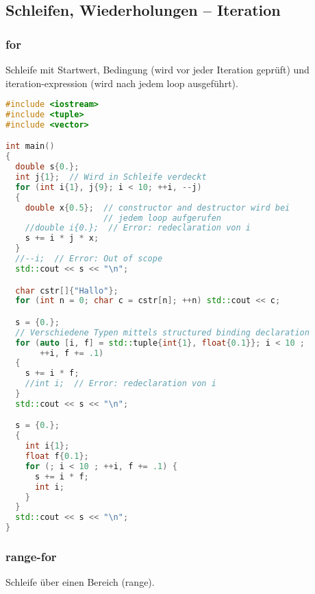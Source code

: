 \documentclass[10pt,twocolumn]{scrartcl}
\begin{document}
\subsection{Schleifen, Wiederholungen -- Iteration}
\subsubsection{for}

Schleife mit Startwert, Bedingung (wird vor jeder Iteration geprüft) und
iteration-expression (wird nach jedem loop ausgeführt).

\begin{lstlisting}[language=C++]
#include <iostream>
#include <tuple>
#include <vector>

int main()
{
  double s{0.};
  int j{1};  // Wird in Schleife verdeckt
  for (int i{1}, j{9}; i < 10; ++i, --j)
  {
    double x{0.5};  // constructor and destructor wird bei
                    // jedem loop aufgerufen
    //double i{0.};  // Error: redeclaration von i
    s += i * j * x;
  }
  //--i;  // Error: Out of scope
  std::cout << s << "\n";

  char cstr[]{"Hallo"};
  for (int n = 0; char c = cstr[n]; ++n) std::cout << c;

  s = {0.};
  // Verschiedene Typen mittels structured binding declaration
  for (auto [i, f] = std::tuple{int{1}, float{0.1}}; i < 10 ;
       ++i, f += .1)
  {
    s += i * f;
    //int i;  // Error: redeclaration von i
  }
  std::cout << s << "\n";

  s = {0.};
  {
    int i{1};
    float f{0.1};
    for (; i < 10 ; ++i, f += .1) {
      s += i * f;
      int i;
    }
  }
  std::cout << s << "\n";
}
\end{lstlisting}

\subsubsection{range-for}

Schleife über einen Bereich (range).
\end{document}
